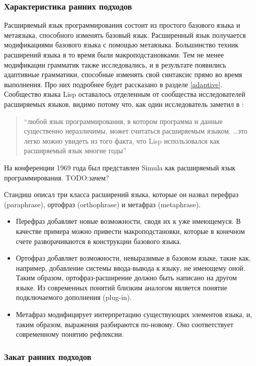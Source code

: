 \documentclass[a4paper,12pt]{article}
\begin{document}
\subsubsection*{Характеристика ранних подходов}

Расширяемый язык программирования состоит из простого базового языка и
метаязыка, способного изменять базовый язык. Расширенный язык получается
модификациями базового языка с помощью метаязыка. Большинство техник расширений
языка в то время были макроподстановками. Тем не менее модификации грамматик 
также исследовались, и в результате появились адаптивные грамматики, способные
изменять свой синтаксис прямо во время выполнения. Про них подробнее будет 
рассказано в разделе \ref{adaptive}. Сообщество языка Lisp оставалось отделенным
от сообщества исследователей расширяемых языков, видимо потому что, как один
исследователь заметил в \cite{harr60}:
\begin{quote}
``любой язык программирования, в котором программа и данные существенно
неразличимы, может считаться расширяемым языком. \ldots это легко можно увидеть
из того факта, что Lisp использовался как расширяемый язык многие годы''
\end{quote}
На конференции 1969 года был представлен Simula как расширяемый язык
программирования. TODO:зачем?

Стандиш описал три класса расширений языка, которые он назвал перефраз
(paraphrase), ортофраз (orthophrase) и метафраз (metaphrase).
\begin{itemize}
  \item Перефраз добавляет новые возможности, сводя их к уже имеющемуся. В
  качестве примера можно привести макроподстановки, которые в конечном счете
  разворачиваются в конструкции базового языка.
  \item Ортофраз добавляет возможности, невыразимые в базовом языке, такие как,
  например, добавление системы ввода-вывода к языку, не имеющему оной. Таким
  образом, ортофраз-расширение должно быть написано на другом языке. Из
  современных понятий близким аналогом является понятие подключаемого дополнения
  (plug-in).
  \item Метафраз модифицирует интерпретацию существующих элементов языка, и,
  таким образом, выражения разбираются по-новому. Оно соответствует
  современному понятию рефлексии.
\end{itemize}

\subsubsection*{Закат ранних подходов}
\end{document}
